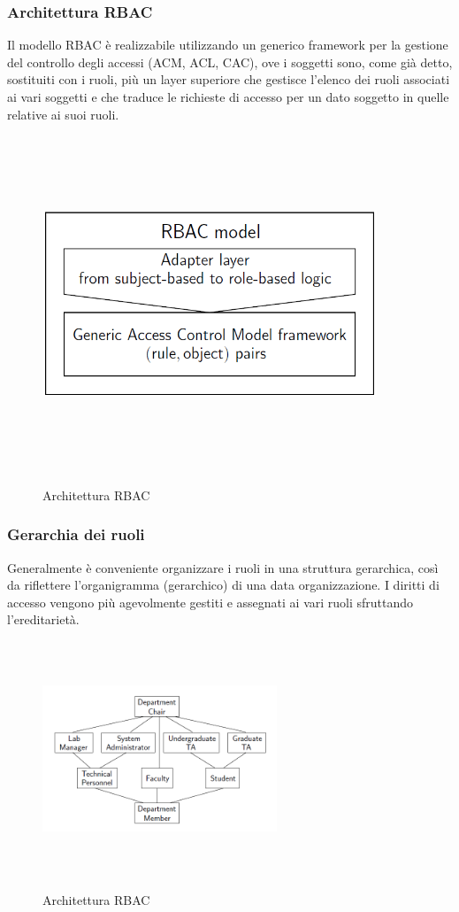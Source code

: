 \subsubsection{Architettura RBAC}
Il modello RBAC è realizzabile utilizzando un generico framework per la gestione del controllo degli accessi (ACM, ACL, CAC), ove i soggetti sono, come già detto, sostituiti con i ruoli, più un layer superiore che gestisce l'elenco dei ruoli associati ai vari soggetti e che traduce le richieste di accesso per un dato soggetto in quelle relative ai suoi ruoli.
\begin{figure}[htbp]
	\centering%
	\subfigure%
	{\includegraphics[height=10cm, width=10cm, keepaspectratio]{Immagini/introduzione/RBAC_arch.png}}
	\caption{Architettura RBAC \label{fig:RBAC_arch}} 	
\end{figure}

\subsubsection{Gerarchia dei ruoli}
Generalmente è conveniente organizzare i ruoli in una struttura gerarchica, così da riflettere l'organigramma (gerarchico) di una data organizzazione. I diritti di accesso vengono più agevolmente gestiti e assegnati ai vari ruoli sfruttando l'ereditarietà.
\begin{figure}[htbp]
	\centering%
	\subfigure%
	{\includegraphics[height=7cm, width=7cm, keepaspectratio]{Immagini/introduzione/RBAC_ger.png}}
	\caption{Architettura RBAC \label{fig:RBAC_ger}} 	
\end{figure}

